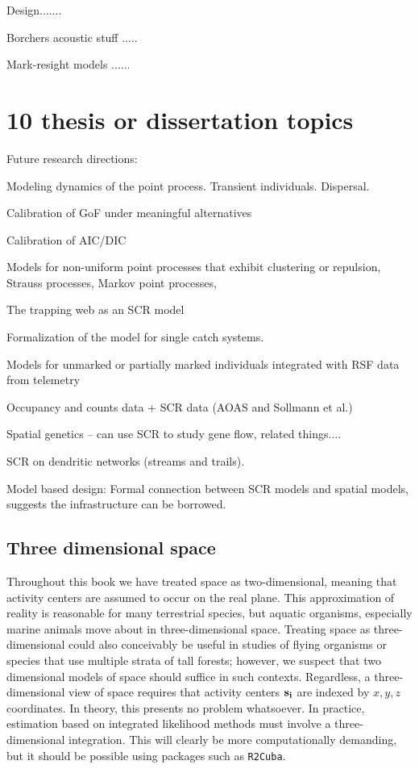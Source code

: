 Design.......

Borchers acoustic stuff .....

Mark-resight models ......


\section{10 thesis or dissertation topics}

Future research directions:

Modeling dynamics of the point process. Transient individuals. 
Dispersal. 

Calibration of GoF under meaningful alternatives

Calibration of AIC/DIC 

Models for non-uniform point processes that exhibit clustering or
repulsion, Strauss processes, Markov point processes, 

The trapping web as an SCR model 

Formalization of the model for single catch systems. 

Models for unmarked or partially marked individuals integrated with
RSF data from telemetry

Occupancy and counts data + SCR data (AOAS and Sollmann et al.)

Spatial genetics  -- can use SCR to study gene flow, related things....

SCR on dendritic networks (streams and trails).

Model based design: Formal connection between SCR models and spatial
models, suggests the infrastructure can be borrowed.

\subsection{Three dimensional space}

Throughout this book we have treated space as
two-dimensional, meaning that activity centers are assumed to occur on
the real plane. This approximation of reality is reasonable for many
terrestrial species, but aquatic organisms, especially marine animals
move about in three-dimensional space. Treating space as
three-dimensional could also conceivably be useful in studies of flying organisms
or species that use multiple strata of tall forests; however, we
suspect that two dimensional models of space should suffice in such
contexts. Regardless, a three-dimensional view of space requires that
activity centers $\bf s_i$ are indexed by
$x,y,z$ coordinates. In theory, this presents no problem whatsoever. In
practice, estimation based on integrated likelihood methods must
involve a three-dimensional integration. This will clearly be more
computationally demanding, but it should be possible using packages
such as {\tt R2Cuba}.




